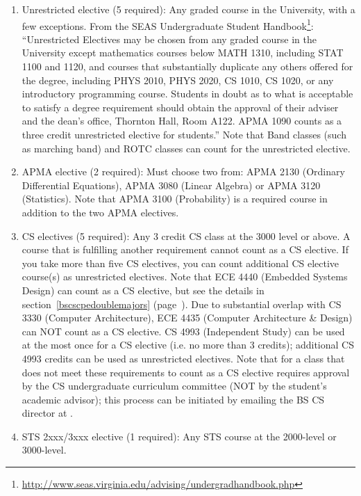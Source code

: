 \documentclass[10pt,letter,twocolumn]{book}
\newcommand{\myurl}[1]{\footnote{\scriptsize\url{#1}}}
\begin{document}
\begin{enumerate}
\item Unrestricted elective (5 required): Any graded course in the
  University, with a few exceptions. From the SEAS Undergraduate
  Student
  Handbook\myurl{http://www.seas.virginia.edu/advising/undergradhandbook.php}:
  ``Unrestricted Electives may be chosen from any graded course in the
  University except mathematics courses below MATH 1310, including
  STAT 1100 and 1120, and courses that substantially duplicate any
  others offered for the degree, including PHYS 2010, PHYS 2020, CS
  1010, CS 1020, or any introductory programming course. Students in
  doubt as to what is acceptable to satisfy a degree requirement
  should obtain the approval of their adviser and the dean's office,
  Thornton Hall, Room A122. APMA 1090 counts as a three credit
  unrestricted elective for students.''  Note that Band classes (such
  as marching band) and ROTC classes can count for the unrestricted
  elective.

\item APMA elective (2 required): Must choose two from: APMA 2130
  (Ordinary Differential Equations), APMA 3080 (Linear
  Algebra) or APMA 3120 (Statistics). Note that APMA 3100
  (Probability) is a required course in addition to the two APMA
  electives.

\item CS electives (5 required): Any 3 credit CS class at the 3000
  level or above. A course that is fulfilling another requirement
  cannot count as a CS elective. If you take more than five CS
  electives, you can count additional CS elective course(s) as
  unrestricted electives. Note that
  ECE 4440 (Embedded Systems Design) can count as a CS elective, but
  see the details in section~\ref{bscscpedoublemajors}
  (page~\pageref{bscscpedoublemajors}).  Due to substantial overlap with
  CS 3330 (Computer Architecture), ECE 4435 (Computer Architecture \&
  Design) can NOT count as a CS elective.  CS 4993
  (Independent Study) can be used at the most once for a CS elective
  (i.e. no more than 3 credits); additional CS 4993 credits can be
  used as unrestricted electives. Note that for a class that does not
  meet these requirements to count as a CS elective requires approval
  by the CS undergraduate curriculum committee (NOT by the student's
  academic advisor); this process can be initiated by emailing the BS
  CS director at \bscsdirectoremail. 

\item STS 2xxx/3xxx elective (1 required): Any STS course at the
  2000-level or 3000-level.
\end{enumerate}
 
\end{document}
